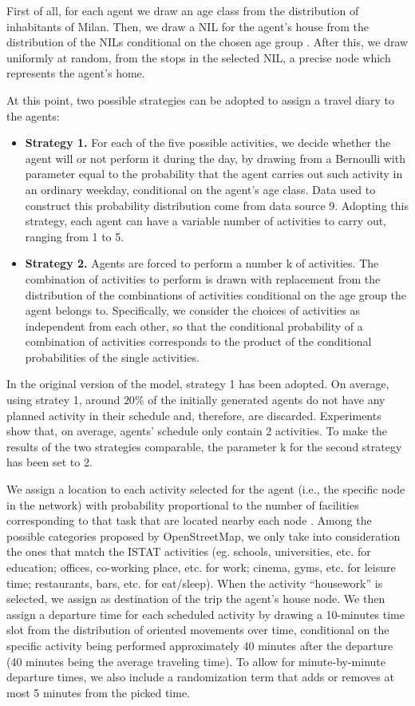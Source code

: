 First of all, for each agent we draw an age class from the distribution of inhabitants of Milan. Then, we draw a NIL for the agent's house from the distribution of the NILs conditional on the chosen age group \cite{site18}. After this, we draw uniformly at random, from the stops in the selected NIL, a precise node which represents the agent’s home. 

At this point, two possible strategies can be adopted to assign a travel diary to the agents:
\begin{itemize}
    \item \textbf{Strategy 1.} For each of the five possible activities, we decide whether the agent will or not perform it during the day, by drawing from a Bernoulli with parameter equal to the probability that the agent carries out such activity in an ordinary weekday, conditional on the agent's age class. Data used to construct this probability distribution come from data source 9. Adopting this strategy, each agent can have a variable number of activities to carry out, ranging from 1 to 5.
    \item \textbf{Strategy 2.} Agents are forced to perform a number k of activities. The combination of activities to perform is  drawn with replacement from the distribution of the combinations of activities conditional on the age group the agent belongs to. Specifically, we consider the choices of activities as independent from each other, so that the conditional probability of a combination of activities corresponds to the product of the conditional probabilities of the single activities.
\end{itemize}
In the original version of the model, strategy 1 has been adopted. On average, using stratey 1, around $20\%$ of the initially generated agents do not have any planned activity in their schedule and, therefore, are discarded. Experiments show that, on average, agents' schedule only contain 2 activities. To make the results of the two strategies comparable, the parameter k for the second strategy has been set to 2.

We assign a location to each activity selected for the agent (i.e., the specific node in the network) with probability proportional to the number of facilities corresponding to that task that are located nearby each node \cite{site9}. Among the possible categories proposed by OpenStreetMap, we only take into consideration the ones that match the ISTAT activities (eg. schools, universities, etc. for education; offices, co-working place, etc. for work; cinema, gyms, etc. for leisure time; restaurants, bars, etc. for eat/sleep). When the activity “housework” is selected, we assign as destination of the trip the agent’s house node. We then assign a departure time for each scheduled activity by drawing a 10-minutes time slot from the distribution of oriented movements over time, conditional on the specific activity \cite{site11} being performed approximately 40 minutes after the departure (40 minutes being the average traveling time). To allow for minute-by-minute departure times, we also include a randomization term that adds or removes at most 5 minutes from the picked time. 

